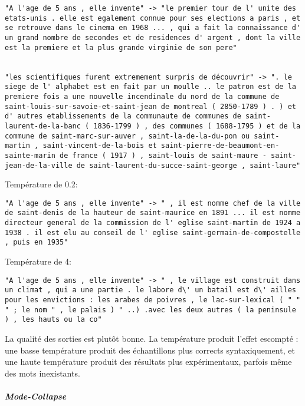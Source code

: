 \begin{verbatim}
"A l'age de 5 ans , elle invente" -> "le premier tour de l' unite des etats-unis . elle est egalement connue pour ses elections a paris , et se retrouve dans le cinema en 1968 ... , qui a fait la connaissance d' un grand nombre de secondes et de residences d' argent , dont la ville est la premiere et la plus grande virginie de son pere"


"les scientifiques furent extremement surpris de découvrir" -> ". le siege de l' alphabet est en fait par un moulle .. le patron est de la premiere fois a une nouvelle incendinale du nord de la commune de saint-louis-sur-savoie-et-saint-jean de montreal ( 2850-1789 ) . ) et d' autres etablissements de la communaute de communes de saint-laurent-de-la-banc ( 1836-1799 ) , des communes ( 1688-1795 ) et de la commune de saint-marc-sur-auver , saint-la-de-la-du-pon ou saint-martin , saint-vincent-de-la-bois et saint-pierre-de-beaumont-en-sainte-marin de france ( 1917 ) , saint-louis de saint-maure - saint-jean-de-la-ville de saint-laurent-du-succe-saint-george , saint-laure"
\end{verbatim}

Température de 0.2:

\begin{verbatim}
"A l'age de 5 ans , elle invente" -> " , il est nomme chef de la ville de saint-denis de la hauteur de saint-maurice en 1891 ... il est nomme directeur general de la commission de l' eglise saint-martin de 1924 a 1938 . il est elu au conseil de l' eglise saint-germain-de-compostelle , puis en 1935"
\end{verbatim}

Température de 4:

\begin{verbatim}
"A l'age de 5 ans , elle invente" -> " , le village est construit dans un climat , qui a une partie . le labore d\' un batail est d\' ailles pour les envictions : les arabes de poivres , le lac-sur-lexical ( " " " ; le nom " , le palais ) " ..) .avec les deux autres ( la peninsule ) , les hauts ou la co"
\end{verbatim}

La qualité des sorties est plutôt bonne. La température produit l'effet
escompté : une basse température produit des échantillons plus corrects
syntaxiquement, et une haute température produit des résultats plus
expérimentaux, parfois même des mots inexistants.

\hypertarget{mode-collapse}{%
\subparagraph{Mode-Collapse}\label{mode-collapse}}

